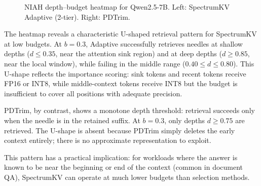 \documentclass[11pt]{article}
\newcommand{\method}{SpectrumKV}
\newcommand{\budget}{b}
\theoremstyle{plain}
\theoremstyle{definition}
\begin{document}
\begin{figure}[H]
\caption{NIAH depth--budget heatmap for Qwen2.5-7B.  Left: SpectrumKV Adaptive (2-tier).  Right: PDTrim.}
\label{fig:niah-heatmap}
\end{figure}

The heatmap reveals a characteristic U-shaped retrieval pattern for \method{} at low budgets.  At $\budget=0.3$, Adaptive successfully retrieves needles at shallow depths ($d \le 0.35$, near the attention sink region) and at deep depths ($d \ge 0.85$, near the local window), while failing in the middle range ($0.40 \le d \le 0.80$).  This U-shape reflects the importance scoring: sink tokens and recent tokens receive FP16 or INT8, while middle-context tokens receive INT8 but the budget is insufficient to cover all positions with adequate precision.

PDTrim, by contrast, shows a monotone depth threshold: retrieval succeeds only when the needle is in the retained suffix.  At $\budget=0.3$, only depths $d \ge 0.75$ are retrieved.  The U-shape is absent because PDTrim simply deletes the early context entirely; there is no approximate representation to exploit.

This pattern has a practical implication: for workloads where the answer is known to be near the beginning or end of the context (common in document QA), \method{} can operate at much lower budgets than selection methods.
\end{document}
